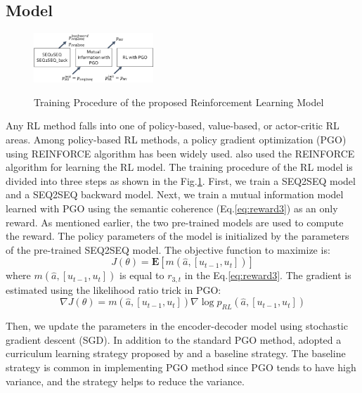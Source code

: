 \subsection{Model}
\begin{figure}[b!]
    \centering
    \includegraphics[width=0.4\textwidth]{three_steps.png} 
    \label{fig:three_steps}
    \caption{\small Training Procedure of the proposed Reinforcement Learning Model}
 \end{figure}
Any RL method falls into one of policy-based, value-based, or actor-critic RL areas. Among policy-based RL methods, a policy gradient optimization (PGO) using REINFORCE algorithm \cite{Williams} has been widely used. \cite{Li} also used the REINFORCE algorithm for learning the RL model. The training procedure of the RL model is divided into three steps as shown in the Fig.\ref{fig:three_steps}. First, we train a SEQ2SEQ model and a SEQ2SEQ backward model. Next, we train a mutual information model learned with PGO using the semantic coherence (Eq.\ref{eq:reward3}) as an only reward. As mentioned earlier, the two pre-trained models are used to compute the reward. The policy parameters of the model is initialized by the parameters of the pre-trained SEQ2SEQ model. The objective function to maximize is:
\begin{equation}
	J(\theta)= 	\mathbf{E} [m(\hat{a},[u_{t-1},u_t])]
\end{equation}
where $m(\hat{a},[u_{t-1},u_t])$ is equal to $r_{3,t}$ in the Eq.\ref{eq:reward3}. The gradient is estimated using the likelihood ratio trick in PGO:
\begin{equation}
	\nabla J(\theta) = m(\hat{a},[u_{t-1},u_t]) \nabla \log p_{RL}(\hat{a},[u_{t-1},u_t]) \label{eq:gradient}
\end{equation}

Then, we update the parameters in the encoder-decoder model using stochastic gradient descent (SGD). In addition to the standard PGO method, \cite{Li} adopted a curriculum learning strategy proposed by \cite{Ranzato} and a baseline strategy. The baseline strategy is common in implementing PGO method since PGO tends to have high variance, and the strategy helps to reduce the variance.
